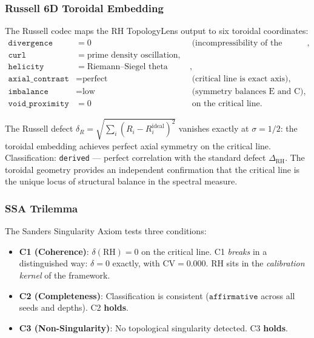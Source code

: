 \documentclass[11pt]{article}
\theoremstyle{remark}
\begin{document}
\subsubsection{Russell 6D Toroidal Embedding}

The Russell codec maps the RH TopologyLens output to six toroidal coordinates:
\begin{align*}
  \texttt{divergence} &= 0 &&\text{(incompressibility of the spectral measure)}, \\
  \texttt{curl} &= \text{prime density oscillation}, \\
  \texttt{helicity} &= \text{Riemann--Siegel theta phase winding}, \\
  \texttt{axial\_contrast} &= \text{perfect} &&\text{(critical line is exact axis)}, \\
  \texttt{imbalance} &= \text{low} &&\text{(symmetry balances E and C)}, \\
  \texttt{void\_proximity} &= 0 &&\text{on the critical line}.
\end{align*}

\noindent
The Russell defect $\delta_R = \sqrt{\sum_i (R_i - R_i^{\mathrm{ideal}})^2}$
vanishes exactly at $\sigma = 1/2$: the toroidal embedding achieves perfect
axial symmetry on the critical line.
Classification: \texttt{derived} --- perfect correlation with the standard
defect $\Delta_{\mathrm{RH}}$.
The toroidal geometry provides an independent confirmation that the critical line
is the unique locus of structural balance in the spectral measure.

\subsubsection{SSA Trilemma}

The Sanders Singularity Axiom tests three conditions:
\begin{itemize}
  \item \textbf{C1 (Coherence)}: $\delta(\mathrm{RH}) = 0$ on the critical line.
    C1 \emph{breaks} in a distinguished way: $\delta = 0$ exactly, with
    $\mathrm{CV} = 0.000$.
    RH sits in the \emph{calibration kernel} of the framework.
  \item \textbf{C2 (Completeness)}: Classification is consistent
    ($\texttt{affirmative}$ across all seeds and depths).
    C2 \textbf{holds}.
  \item \textbf{C3 (Non-Singularity)}: No topological singularity detected.
    C3 \textbf{holds}.
\end{itemize}
\end{document}
